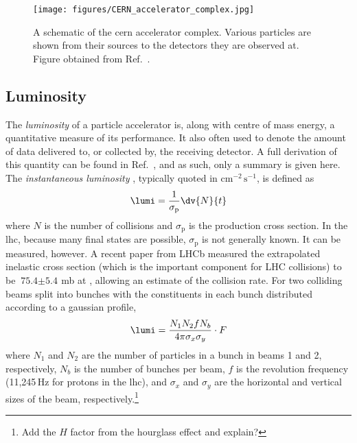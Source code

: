 \begin{figure}[htbp]
    \centering
    \texttt{[image: figures/CERN\_accelerator\_complex.jpg]}
    \caption[A schematic of the \acrshort{cern} accelerator complex]{A schematic of the \acrshort{cern} accelerator complex. Various particles are shown from their sources to the detectors they are observed at. Figure obtained from Ref.~.}
    \label{fig:cern_accelerator_complex}
\end{figure}





\subsection{Luminosity}
\label{subsec:luminosity}

The \emph{\gls{luminosity}} of a particle accelerator is, along with centre of mass energy, a quantitative measure of its performance. It also often used to denote the amount of data delivered to, or collected by, the receiving detector. A full derivation of this quantity can be found in Ref.~, and as such, only a summary is given here. The \emph{instantaneous luminosity} \lumi, typically quoted in $\text{cm}^{-2}\,\text{s}^{-1}$, is defined as
\begin{equation}
    \lumi = \frac{1}{\sigma_{\mathrm{p}}} \dv{N}{t}
    \label{eq:lumi_instantaneous}
\end{equation}
where $N$ is the number of collisions and $\sigma_{\mathrm{p}}$ is the production cross section. In the \acrshort{lhc}, because many final states are possible, $\sigma_{\mathrm{p}}$ is not generally known. It can be measured, however. A recent paper from LHCb measured the extrapolated inelastic cross section (which is the important component for LHC collisions) to be $\text{75.4} \pm \text{5.4}$\,mb at \comruntwo \cite{Aaij:2018okq}, allowing an estimate of the collision rate. For two colliding beams split into bunches with the constituents in each bunch distributed according to a gaussian profile,
\begin{equation}
    \lumi = \frac{N_1 N_2 f N_b}{4 \pi \sigma_x \sigma_y} \cdot F %
    \label{eq:lumi_inst_head_on_colliding_beams}
\end{equation}
where $N_1$ and $N_2$ are the number of particles in a bunch in beams 1 and 2, respectively, $N_b$ is the number of bunches per beam, $f$ is the revolution frequency (11,245\,Hz for protons in the \acrshort{lhc}), and $\sigma_x$ and $\sigma_y$ are the horizontal and vertical sizes of the beam, respectively.\footnote{Add the $H$ factor from the hourglass effect and explain?}

